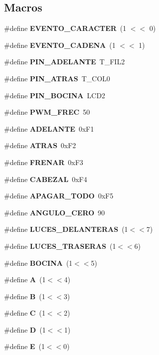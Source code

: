 \subsection*{Macros}
\begin{DoxyCompactItemize}
\item 
\#define \textbf{ E\+V\+E\+N\+T\+O\+\_\+\+C\+A\+R\+A\+C\+T\+ER}~(1 $<$$<$ 0)
\item 
\#define \textbf{ E\+V\+E\+N\+T\+O\+\_\+\+C\+A\+D\+E\+NA}~(1 $<$$<$ 1)
\item 
\#define \textbf{ P\+I\+N\+\_\+\+A\+D\+E\+L\+A\+N\+TE}~T\+\_\+\+F\+I\+L2
\item 
\#define \textbf{ P\+I\+N\+\_\+\+A\+T\+R\+AS}~T\+\_\+\+C\+O\+L0
\item 
\#define \textbf{ P\+I\+N\+\_\+\+B\+O\+C\+I\+NA}~L\+C\+D2
\item 
\#define \textbf{ P\+W\+M\+\_\+\+F\+R\+EC}~50
\item 
\#define \textbf{ A\+D\+E\+L\+A\+N\+TE}~0x\+F1
\item 
\#define \textbf{ A\+T\+R\+AS}~0x\+F2
\item 
\#define \textbf{ F\+R\+E\+N\+AR}~0x\+F3
\item 
\#define \textbf{ C\+A\+B\+E\+Z\+AL}~0x\+F4
\item 
\#define \textbf{ A\+P\+A\+G\+A\+R\+\_\+\+T\+O\+DO}~0x\+F5
\item 
\#define \textbf{ A\+N\+G\+U\+L\+O\+\_\+\+C\+E\+RO}~90
\item 
\#define \textbf{ L\+U\+C\+E\+S\+\_\+\+D\+E\+L\+A\+N\+T\+E\+R\+AS}~(1$<$$<$7)
\item 
\#define \textbf{ L\+U\+C\+E\+S\+\_\+\+T\+R\+A\+S\+E\+R\+AS}~(1$<$$<$6)
\item 
\#define \textbf{ B\+O\+C\+I\+NA}~(1$<$$<$5)
\item 
\#define \textbf{ A}~(1$<$$<$4)
\item 
\#define \textbf{ B}~(1$<$$<$3)
\item 
\#define \textbf{ C}~(1$<$$<$2)
\item 
\#define \textbf{ D}~(1$<$$<$1)
\item 
\#define \textbf{ E}~(1$<$$<$0)
\end{DoxyCompactItemize}
